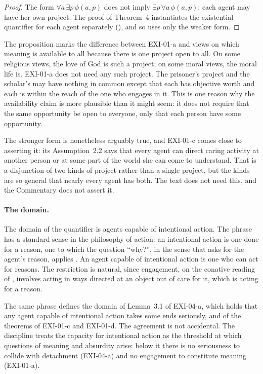 \begin{proof}
The form $\forall a\,\exists p\,\phi(a,p)$ does not imply $\exists p\,\forall a\,\phi(a,p)$: each agent may have her own project. The proof of Theorem~4 instantiates the existential quantifier for each agent separately (), and so uses only the weaker form.
\end{proof}

The proposition marks the difference between EXI-01-a and views on which meaning is available to all because there is one project open to all. On some religious views, the love of God is such a project; on some moral views, the moral life is. EXI-01-a does not need any such project. The prisoner's project and the scholar's may have nothing in common except that each has objective worth and each is within the reach of the one who engages in it. This is one reason why the availability claim is more plausible than it might seem: it does not require that the same opportunity be open to everyone, only that each person have some opportunity.

The stronger form is nonetheless arguably true, and EXI-01-c comes close to asserting it: its Assumption~2.2 says that every agent can direct caring activity at another person or at some part of the world she can come to understand. That is a disjunction of two kinds of project rather than a single project, but the kinds are so general that nearly every agent has both. The text does not need this, and the Commentary does not assert it.


\paragraph{The domain.} The domain of the quantifier is agents capable of intentional action. The phrase has a standard sense in the philosophy of action: an intentional action is one done for a reason, one to which the question \enquote{why?}, in the sense that asks for the agent's reason, applies \citep{Anscombe1957}. An agent capable of intentional action is one who can act for reasons. The restriction is natural, since engagement, on the conative reading of , involves acting in ways directed at an object out of care for it, which is acting for a reason.

The same phrase defines the domain of Lemma~3.1 of EXI-04-a, which holds that any agent capable of intentional action takes some ends seriously, and of the theorems of EXI-01-c and EXI-01-d. The agreement is not accidental. The discipline treats the capacity for intentional action as the threshold at which questions of meaning and absurdity arise: below it there is no seriousness to collide with detachment (EXI-04-a) and no engagement to constitute meaning (EXI-01-a).

